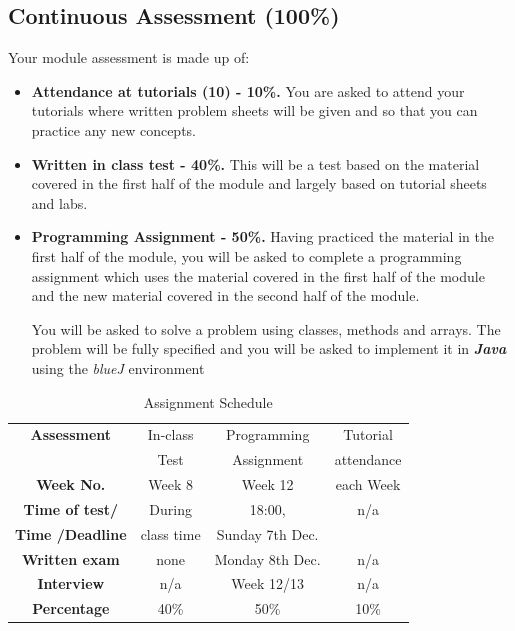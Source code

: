 \documentclass{article}
\begin{document}
\subsection{Continuous Assessment (100\%) }
Your module assessment  is made up of:  
    \begin{itemize}
        \item \textbf{Attendance at tutorials (10) - 10\%.} You are  asked to attend your tutorials where written problem sheets will be given and so that you can practice any new concepts. 
        \item \textbf{Written in class test - 40\%.} This will be a test based on the material covered in the first half of the module and largely based on tutorial sheets and labs. 
        \item \textbf{Programming Assignment  - 50\%. }
        Having practiced the material in the first half of the module, you will be asked to complete a programming assignment which uses the material covered in the first half of the module and the new material covered in the second half of the module.
        
        You will be asked to solve a problem using classes, methods and arrays. The problem will be fully specified and you will be asked to implement it in \textbf{\textit{Java}} using the \textit{blueJ} environment
    \end{itemize}

  \begin{table}
    \begin{center}
        \begin{tabular}{|c|c|c|c|}
            \hline
            \rowcolor{red!60}
            \textbf{Assessment} & In-class & Programming & Tutorial  \\
               \rowcolor{red!60}
            \ & Test & Assignment &  attendance \\

            \hline
            \rowcolor{red!30}
            \textbf{Week No.} & Week 8 & Week 12 & each Week \\
            \hline
            \rowcolor{red!30}
            \textbf{Time of test/} & During  & 18:00,  & n/a \\
            \rowcolor{red!30}
            \textbf{Time /Deadline} & class time& Sunday 7th Dec.& \\
            \hline
            \rowcolor{red!35}
            \textbf{Written exam} & none & Monday 8th Dec. & n/a \\
            \hline
            \rowcolor{red!40}
            \textbf{Interview} & n/a & Week 12/13 & n/a \\
            \hline
            \rowcolor{red!60}
            \textbf{Percentage} & 40\% & 50\% & 10\% \\
            \hline
        \end{tabular}
        \caption{Assignment Schedule}
        \label{tab:ass-schedule}
    \end{center}
\end{table}
\end{document}
